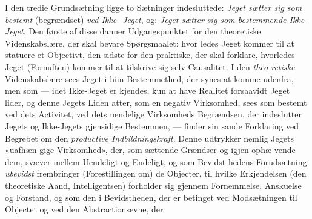 \documentclass[12pt,a4paper]{book}
\begin{document}
I den tredie Grundsætning ligge to Sætninger indesluttede:
\emph{Jeget sætter sig som bestemt} (begrændset) \emph{ved Ikke-%
Jeget}, og: \emph{Jeget sætter sig som bestemmende Ikke-%
Jeget}. Den første af disse danner Udgangspunktet for den
theoretiske Videnskabslære, der skal bevare Spørgsmaalet: hvor\-%
ledes Jeget kommer til at statuere et Objectivt, den sidste for
den praktiske, der skal forklare, hvorledes Jeget (Fornuften)
kommer til at tilskrive sig selv Causalitet. I den \emph{theo\-%
retiske} Videnskabslære sees Jeget i hiin Bestemmethed, der
synes at komme udenfra, men som --- idet Ikke-Jeget er\-%
kjendes, kun at have Realitet forsaavidt Jeget lider, og denne
Jegets Liden atter, som en negativ Virksomhed, sees som bestemt
ved dets Activitet, ved dets uendelige Virksomheds Begrændsen,
der indeslutter Jegets og Ikke-Jegets gjensidige Bestemmen, ---
finder sin sande Forklaring ved Begrebet om den \emph{productive
Indbildningskraft}. Denne udtrykker nemlig Jegets «uafhæn\-%
gige Virksomhed», der, som sættende Grændser og igjen ophæ\-%
vende dem, svæver mellem Uendeligt og Endeligt, og som Bevidst\-%
hedens Forudsætning \emph{ubevidst} frembringer (Forestillingen om)
de Objecter, til hvilke Erkjendelsen (den theoretiske Aand,
Intelligentsen) forholder sig gjennem Fornemmelse, Anskuelse
og Forstand, og som den i Bevidstheden, der er betinget ved
Modsætningen til Objectet og ved den Abstractionsevne, der
\end{document}
